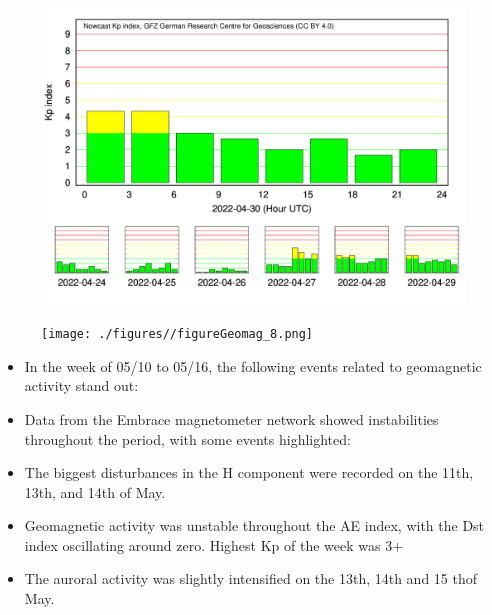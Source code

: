\documentclass[a4paper, 10pt]{article}
\begin{document}
                     \begin{figure}[H]
    
                        \centering
   
                             \includegraphics[width=14cm]{./figures//figureGeomag_7.png}

                        \end{figure}

                     \begin{figure}[H]
    
                        \centering
   
                             \texttt{[image: ./figures//figureGeomag\_8.png]}

                        \end{figure}

                     \begin{itemize} 
\item In the week of 05/10 to 05/16, the following events related to geomagnetic activity stand out:
\item Data from the Embrace magnetometer network showed instabilities throughout the period, with some events highlighted:
\item The biggest disturbances in the H component were recorded on the 11th, 13th, and 14th of May.
\item Geomagnetic activity was unstable throughout the AE index, with the Dst index oscillating around zero. Highest Kp of the week was 3+
\item  The auroral activity was slightly intensified on the 13th, 14th and 15 thof May.
\end{itemize} 
\end{document}
